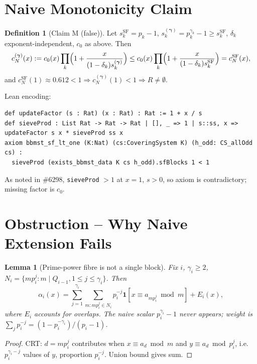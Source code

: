 \documentclass[11pt,a4paper]{article}
\theoremstyle{plain}
\newtheorem{lemma}[theorem]{Lemma}
\theoremstyle{definition}
\newtheorem{definition}[theorem]{Definition}
\theoremstyle{remark}
\begin{document}
\section{Naive Monotonicity Claim}

\begin{definition}[Claim M (false)]
Let $s_{k}^{\mathrm{SF}}=p_{k}-1$, $s_{k}^{(\boldsymbol\gamma)}=p_{k}^{\gamma_{k}}-1\ge s_{k}^{\mathrm{SF}}$, $\delta_{k}$ exponent-independent, $c_{0}$ as above. Then
\[
c_{N}^{(\boldsymbol\gamma)}(x):=c_{0}(x)\prod_{k}\Bigl(1+\frac{x}{(1-\delta_{k})s_{k}^{(\boldsymbol\gamma)}}\Bigr)
\le c_{0}(x)\prod_{k}\Bigl(1+\frac{x}{(1-\delta_{k})s_{k}^{\mathrm{SF}}}\Bigr)=c_{N}^{\mathrm{SF}}(x),
\]
and $c_{N}^{\mathrm{SF}}(1)\approx0.612<1\Rightarrow c_{N}^{(\boldsymbol\gamma)}(1)<1\Rightarrow R\neq\emptyset$.
\end{definition}

Lean encoding:
\begin{verbatim}
def updateFactor (s : Rat) (x : Rat) : Rat := 1 + x / s
def sieveProd : List Rat -> Rat -> Rat | [], _ => 1 | s::ss, x => updateFactor s x * sieveProd ss x
axiom bbmst_sf_lt_one (K:Nat) (cs:CoveringSystem K) (h_odd: CS_allOdd cs) :
  sieveProd (exists_bbmst_data K cs h_odd).sfBlocks 1 < 1
\end{verbatim}
As noted in \#6298, \texttt{sieveProd} $>1$ at $x=1$, $s>0$, so axiom is contradictory; missing factor is $c_{0}$.

\section{Obstruction -- Why Naive Extension Fails}

\begin{lemma}[Prime-power fibre is not a single block]\label{lem:fibre}
Fix $i$, $\gamma_{i}\ge2$, $N_{i}=\{m p_{i}^{j}:m\mid Q_{i-1},1\le j\le\gamma_{i}\}$. Then
\[
\alpha_{i}(x)=\sum_{j=1}^{\gamma_{i}}\sum_{m:m p_{i}^{j}\in N_{i}}p_{i}^{-j}\mathbf1[x\equiv a_{m p_{i}^{j}}\bmod m]+E_{i}(x),
\]
where $E_{i}$ accounts for overlaps. The naive scalar $p_{i}^{\gamma_{i}}-1$ never appears; weight is $\sum_{j}p_{i}^{-j}=(1-p_{i}^{-\gamma_{i}})/(p_{i}-1)$.
\end{lemma}
\begin{proof}
CRT: $d=m p_{i}^{j}$ contributes when $x\equiv a_{d}\bmod m$ and $y\equiv a_{d}\bmod p_{i}^{j}$, i.e. $p_{i}^{\gamma_{i}-j}$ values of $y$, proportion $p_{i}^{-j}$. Union bound gives sum.
\end{proof}
\end{document}
